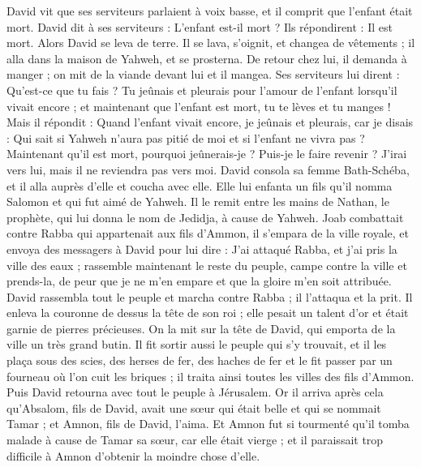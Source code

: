 \begin{multicols}{2}
David vit que ses serviteurs parlaient à voix basse, et il comprit que l'enfant était mort. David dit à ses serviteurs : L'enfant est-il mort ? Ils répondirent : Il est mort.
Alors David se leva de terre. Il se lava, s'oignit, et changea de vêtements ; il alla dans la maison de Yahweh, et se prosterna. De retour chez lui, il demanda à manger ; on mit de la viande devant lui et il mangea.
Ses serviteurs lui dirent : Qu'est-ce que tu fais ? Tu jeûnais et pleurais pour l'amour de l'enfant lorsqu'il vivait encore ; et maintenant que l'enfant est mort, tu te lèves et tu manges !
Mais il répondit : Quand l'enfant vivait encore, je jeûnais et pleurais, car je disais : Qui sait si Yahweh n'aura pas pitié de moi et si l'enfant ne vivra pas ?
Maintenant qu'il est mort, pourquoi jeûnerais-je ? Puis-je le faire revenir ? J'irai vers lui, mais il ne reviendra pas vers moi.
David consola sa femme Bath-Schéba, et il alla auprès d'elle et coucha avec elle. Elle lui enfanta un fils qu'il nomma Salomon et qui fut aimé de Yahweh.
Il le remit entre les mains de Nathan, le prophète, qui lui donna le nom de Jedidja, à cause de Yahweh.
Joab combattait contre Rabba qui appartenait aux fils d'Ammon, il s'empara de la ville royale,
et envoya des messagers à David pour lui dire : J'ai attaqué Rabba, et j'ai pris la ville des eaux ;
rassemble maintenant le reste du peuple, campe contre la ville et prends-la, de peur que je ne m'en empare et que la gloire m'en soit attribuée.
David rassembla tout le peuple et marcha contre Rabba ; il l'attaqua et la prit.
Il enleva la couronne de dessus la tête de son roi ; elle pesait un talent d'or et était garnie de pierres précieuses. On la mit sur la tête de David, qui emporta de la ville un très grand butin.
Il fit sortir aussi le peuple qui s'y trouvait, et il les plaça sous des scies, des herses de fer, des haches de fer et le fit passer par un fourneau où l'on cuit les briques ; il traita ainsi toutes les villes des fils d'Ammon. Puis David retourna avec tout le peuple à Jérusalem.
\VerseOne{}Or il arriva après cela qu'Absalom, fils de David, avait une sœur qui était belle et qui se nommait Tamar ; et Amnon, fils de David, l'aima.
Et Amnon fut si tourmenté qu'il tomba malade à cause de Tamar sa sœur, car elle était vierge ; et il paraissait trop difficile à Amnon d'obtenir la moindre chose d'elle.

\end{multicols}

